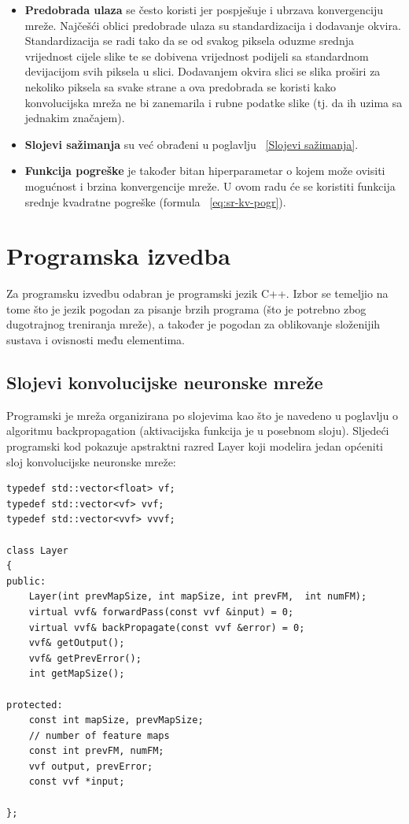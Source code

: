 \documentclass[times, utf8, zavrsni, numeric]{fer}
\begin{document}
\begin{itemize}
\item \textbf{Predobrada ulaza} se često koristi jer pospješuje i ubrzava konvergenciju mreže. Najčešći oblici predobrade ulaza su standardizacija i dodavanje okvira. Standardizacija se radi tako da se od svakog piksela oduzme srednja vrijednost cijele slike te se dobivena vrijednost podijeli sa standardnom devijacijom svih piksela u slici. Dodavanjem okvira slici se slika proširi za nekoliko piksela sa svake strane a ova predobrada se koristi kako konvolucijska mreža ne bi zanemarila i rubne podatke slike (tj. da ih uzima sa jednakim značajem).

\item \textbf{Slojevi sažimanja} su već obrađeni u poglavlju ~\ref{Slojevi sažimanja}.

\item \textbf{Funkcija pogreške} je također bitan hiperparametar o kojem može ovisiti mogućnost i brzina konvergencije mreže. U ovom radu će se koristiti funkcija srednje kvadratne pogreške (formula ~\ref{eq:sr-kv-pogr}).

\end{itemize}

\chapter{Programska izvedba}
Za programsku izvedbu odabran je programski jezik C++. Izbor se temeljio na tome što je jezik pogodan za pisanje brzih programa (što je potrebno zbog dugotrajnog treniranja mreže), a također je pogodan za oblikovanje složenijih sustava i ovisnosti među elementima. 

\section{Slojevi konvolucijske neuronske mreže}
Programski je mreža organizirana po slojevima kao što je navedeno u poglavlju o algoritmu backpropagation (aktivacijska funkcija je u posebnom sloju). Sljedeći programski kod pokazuje apstraktni razred Layer koji modelira jedan općeniti sloj konvolucijske neuronske mreže:

\renewcommand{\lstlistingname}{Programski kod}
\begin{lstlisting}[caption=Razred Layer,
  label=Layer]
typedef std::vector<float> vf;
typedef std::vector<vf> vvf;
typedef std::vector<vvf> vvvf;

class Layer
{
public:
    Layer(int prevMapSize, int mapSize, int prevFM,  int numFM);
    virtual vvf& forwardPass(const vvf &input) = 0;
    virtual vvf& backPropagate(const vvf &error) = 0;
    vvf& getOutput();
    vvf& getPrevError();
    int getMapSize();

protected:
    const int mapSize, prevMapSize;
    // number of feature maps
    const int prevFM, numFM;
    vvf output, prevError;
    const vvf *input;

};
\end{lstlisting}
\end{document}

